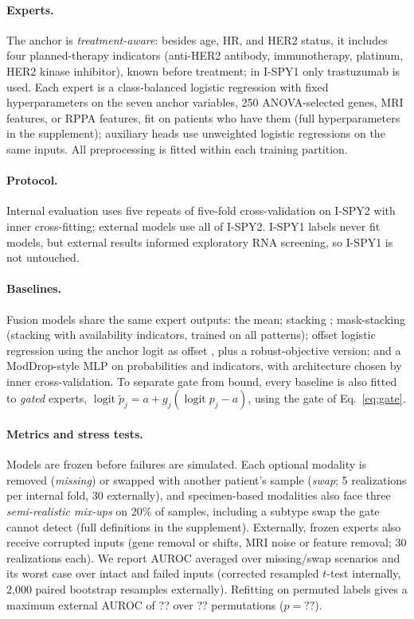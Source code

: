 \documentclass[a4paper,runningheads]{llncs}
\providecommand{\PermMaxCarf}{??}\providecommand{\NPerm}{??}\providecommand{\PermPCarf}{??}
\newcommand{\logit}{\operatorname{logit}}
\begin{document}
\paragraph{Experts.} The anchor is \emph{treatment-aware}: besides age, HR, and HER2 status, it includes four planned-therapy indicators (anti-HER2 antibody, immunotherapy, platinum, HER2 kinase inhibitor), known before treatment; in I-SPY1 only trastuzumab is used. Each expert is a class-balanced logistic regression with fixed hyperparameters on the seven anchor variables, 250 ANOVA-selected genes, \NMriFeat{} MRI features, or RPPA features, fit on patients who have them (full hyperparameters in the supplement); auxiliary heads use unweighted logistic regressions on the same inputs. All preprocessing is fitted within each training partition.

\paragraph{Protocol.} Internal evaluation uses five repeats of five-fold cross-validation on I-SPY2 with inner cross-fitting; external models use all of I-SPY2. I-SPY1 labels never fit models, but external results informed exploratory RNA screening, so I-SPY1 is not untouched.

\paragraph{Baselines.} Fusion models share the same expert outputs: the mean; stacking \cite{wolpert1992}; mask-stacking (stacking with availability indicators, trained on all patterns); offset logistic regression using the anchor logit as offset \cite{janssen2008}, plus a robust-objective version; and a ModDrop-style MLP \cite{neverova2015} on probabilities and indicators, with architecture chosen by inner cross-validation. To separate gate from bound, every baseline is also fitted to \emph{gated} experts, $\logit\tilde p_j=a+g_j(\logit p_j-a)$, using the gate of Eq.~\eqref{eq:gate}.

\paragraph{Metrics and stress tests.} Models are frozen before failures are simulated. Each optional modality is removed (\emph{missing}) or swapped with another patient's sample (\emph{swap}; 5 realizations per internal fold, 30 externally), and specimen-based modalities also face three \emph{semi-realistic mix-ups} on 20\% of samples, including a subtype swap the gate cannot detect (full definitions in the supplement). Externally, frozen experts also receive corrupted inputs (gene removal or shifts, MRI noise or feature removal; 30 realizations each). We report AUROC averaged over missing/swap scenarios and its worst case over intact and failed inputs (corrected resampled $t$-test \cite{nadeau2003} internally, 2{,}000 paired bootstrap resamples externally). Refitting on permuted labels gives a maximum external AUROC of \PermMaxCarf{} over \NPerm{} permutations ($p=\PermPCarf$).
\end{document}
